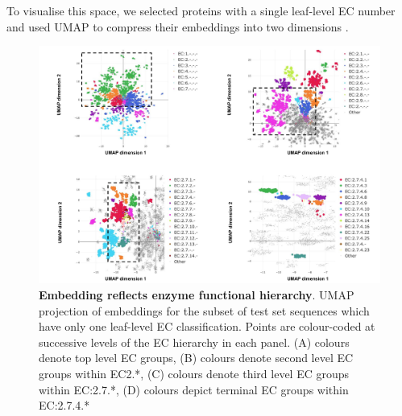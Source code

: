 To visualise this space, we selected proteins with a single leaf-level EC number and used UMAP to compress their embeddings into two dimensions \citep{umap}.
\begin{figure}
\centering
  \includegraphics[width=\textwidth]{Figures/umap2.pdf}%
  \caption{\textbf{Embedding reflects enzyme functional hierarchy}. UMAP projection of embeddings for the subset of test set sequences which have only one leaf-level EC classification. Points are colour-coded at successive levels of the EC hierarchy in each panel. (A) colours denote top level EC groups, (B) colours denote second level EC groups within EC2.*, (C) colours denote third level EC groups within EC:2.7.*, (D) colours depict terminal EC groups within EC:2.7.4.* }
  \label{fig:umap}
\end{figure}
